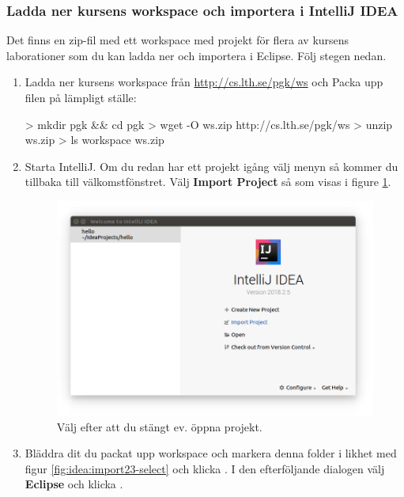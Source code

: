 \clearpage

\subsubsection{Ladda ner kursens workspace och importera i IntelliJ IDEA}

Det finns en zip-fil med ett workspace med projekt för flera av kursens laborationer som du kan ladda ner och importera i Eclipse. Följ stegen nedan.

\begin{enumerate}
\item Ladda ner kursens workspace från \url{http://cs.lth.se/pgk/ws} och Packa upp filen på lämpligt ställe:
\begin{REPLnonum}
> mkdir pgk && cd pgk
> wget -O ws.zip http://cs.lth.se/pgk/ws
> unzip ws.zip
> ls
workspace  ws.zip
\end{REPLnonum}

\item Starta IntelliJ. Om du redan har ett projekt igång välj menyn  så kommer du tillbaka till välkomstfönstret. Välj \textbf{Import Project} så som visas i figure \ref{fig:idea:import1-project}.

\begin{figure}[H]
\centering
\includegraphics[width=1.0\textwidth]{../img/intellij/idea-import1-project.png}
\caption{Välj  efter att du stängt ev. öppna projekt.}
\label{fig:idea:import1-project}
\end{figure}

\item Bläddra dit du packat upp workspace och markera denna folder i likhet med figur \ref{fig:idea:import23-select} och klicka . I den efterföljande dialogen välj \textbf{Eclipse} och klicka .


\end{enumerate}
